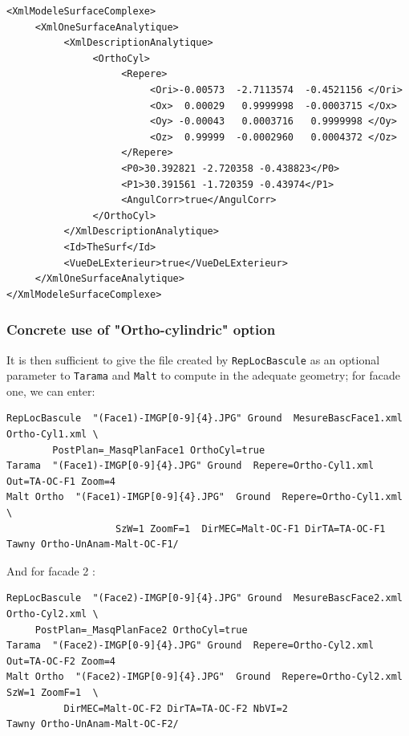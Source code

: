 \begin{verbatim}
<XmlModeleSurfaceComplexe>
     <XmlOneSurfaceAnalytique>
          <XmlDescriptionAnalytique>
               <OrthoCyl>
                    <Repere>
                         <Ori>-0.00573  -2.7113574  -0.4521156 </Ori>
                         <Ox>  0.00029   0.9999998  -0.0003715 </Ox>
                         <Oy> -0.00043   0.0003716   0.9999998 </Oy>
                         <Oz>  0.99999  -0.0002960   0.0004372 </Oz>
                    </Repere>
                    <P0>30.392821 -2.720358 -0.438823</P0>
                    <P1>30.391561 -1.720359 -0.43974</P1>
                    <AngulCorr>true</AngulCorr>
               </OrthoCyl>
          </XmlDescriptionAnalytique>
          <Id>TheSurf</Id>
          <VueDeLExterieur>true</VueDeLExterieur>
     </XmlOneSurfaceAnalytique>
</XmlModeleSurfaceComplexe>
\end{verbatim}

\subsubsection{Concrete use of "Ortho-cylindric" option}

It is then sufficient to give the file created by  {\tt RepLocBascule}
as an optional parameter to {\tt Tarama} and {\tt Malt} to compute
in the adequate geometry; for facade one, we can enter:


\begin{verbatim}
RepLocBascule  "(Face1)-IMGP[0-9]{4}.JPG" Ground  MesureBascFace1.xml Ortho-Cyl1.xml \
        PostPlan=_MasqPlanFace1 OrthoCyl=true
Tarama  "(Face1)-IMGP[0-9]{4}.JPG" Ground  Repere=Ortho-Cyl1.xml  Out=TA-OC-F1 Zoom=4
Malt Ortho  "(Face1)-IMGP[0-9]{4}.JPG"  Ground  Repere=Ortho-Cyl1.xml  \
                   SzW=1 ZoomF=1  DirMEC=Malt-OC-F1 DirTA=TA-OC-F1
Tawny Ortho-UnAnam-Malt-OC-F1/
\end{verbatim}

And for facade 2 :

\begin{verbatim}
RepLocBascule  "(Face2)-IMGP[0-9]{4}.JPG" Ground  MesureBascFace2.xml Ortho-Cyl2.xml \
     PostPlan=_MasqPlanFace2 OrthoCyl=true
Tarama  "(Face2)-IMGP[0-9]{4}.JPG" Ground  Repere=Ortho-Cyl2.xml  Out=TA-OC-F2 Zoom=4
Malt Ortho  "(Face2)-IMGP[0-9]{4}.JPG"  Ground  Repere=Ortho-Cyl2.xml  SzW=1 ZoomF=1  \
          DirMEC=Malt-OC-F2 DirTA=TA-OC-F2 NbVI=2
Tawny Ortho-UnAnam-Malt-OC-F2/
\end{verbatim}

